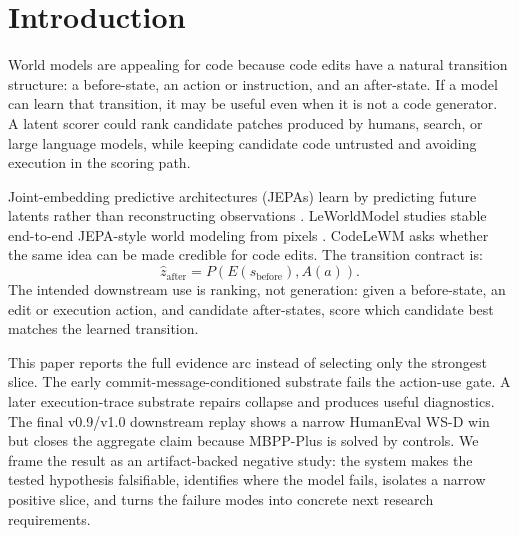 \documentclass[11pt]{article}
\newcommand{\modelname}{CodeLeWM}
\begin{document}
\section{Introduction}

World models are appealing for code because code edits have a natural
transition structure: a before-state, an action or instruction, and an
after-state. If a model can learn that transition, it may be useful even when
it is not a code generator. A latent scorer could rank candidate patches
produced by humans, search, or large language models, while keeping candidate
code untrusted and avoiding execution in the scoring path.

Joint-embedding predictive architectures (JEPAs) learn by predicting future
latents rather than reconstructing observations
\citep{assran2023selfsupervisedlearningimagesjointembedding,bardes2024revisitingfeaturepredictionlearning}.
LeWorldModel studies stable end-to-end JEPA-style world modeling from pixels
\citep{maes2026leworldmodelstableendtoendjointembedding}. \modelname{} asks
whether the same idea can be made credible for code edits. The transition
contract is:
\begin{equation}
\label{eq:contract}
  \hat z_{\mathrm{after}} =
  P(E(s_{\mathrm{before}}), A(a)).
\end{equation}
The intended downstream use is ranking, not generation: given a before-state,
an edit or execution action, and candidate after-states, score which candidate
best matches the learned transition.

This paper reports the full evidence arc instead of selecting only the
strongest slice. The early commit-message-conditioned substrate fails the
action-use gate. A later execution-trace substrate repairs collapse and
produces useful diagnostics. The final v0.9/v1.0 downstream replay shows a
narrow HumanEval WS-D win but closes the aggregate claim because MBPP-Plus is
solved by controls. We frame the result as an artifact-backed negative study:
the system makes the tested hypothesis falsifiable, identifies where the model
fails, isolates a narrow positive slice, and turns the failure modes into
concrete next research requirements.
\end{document}

